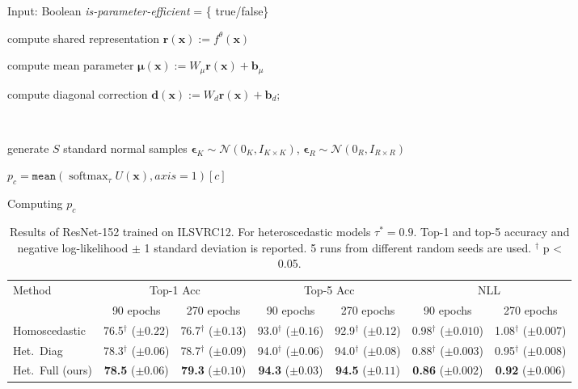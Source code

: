 \documentclass[final]{cvpr}
\DeclareMathOperator*{\softmax}{softmax}
\begin{document}
\begin{algorithm}[t]
\SetAlgoLined
Input: Boolean \textit{is-parameter-efficient} = \{ true/false\}\;

 compute shared representation $\mathbf{r}(\mathbf{x}) := f^{\theta}(\mathbf{x})$\;
 
 compute mean parameter $\boldsymbol{\mu}(\mathbf{x}) := W_\mu \mathbf{r}(\mathbf{x}) + \mathbf{b}_\mu$\;
 
 compute diagonal correction $\mathbf{d}(\mathbf{x}) := W_d \mathbf{r}(\mathbf{x}) + \mathbf{b}_d$;
 
 \
 
 generate $S$ standard normal samples $\boldsymbol{\epsilon}_K \sim \mathcal{N}(0_K, I_{K\times K})$, $\boldsymbol{\epsilon}_R \sim \mathcal{N}(0_R, I_{R\times R})$\;

  
  $p_c =\texttt{mean}(\softmax_{\tau} U(\mathbf{x}), axis=1)[c]$
 \caption{Computing $p_c$}
 \label{algo:compute_pc}
\end{algorithm}

\begin{table*}[tbh]
\centering
\begin{tabular}{lcccccc}
\toprule
Method & \multicolumn{2}{c}{Top-1 Acc} & \multicolumn{2}{c}{Top-5 Acc} & \multicolumn{2}{c}{NLL} \\
& 90 epochs & 270 epochs & 90 epochs & 270 epochs & 90 epochs & 270 epochs \\
\midrule
Homoscedastic & 76.5$^\dagger$ ($\pm 0.22$) & 76.7$^\dagger$ ($\pm 0.13$) & 93.0$^\dagger$ ($\pm 0.16$) & 92.9$^\dagger$ ($\pm 0.12$) & 0.98$^\dagger$ ($\pm 0.010$) & 1.08$^\dagger$ ($\pm 0.007$) \\
Het.\ Diag~\cite{collier2020analysis} & 78.3$^\dagger$ ($\pm 0.06$) & 78.7$^\dagger$   ($\pm 0.09$) & 94.0$^\dagger$ ($\pm 0.06$) & 94.0$^\dagger$ ($\pm 0.08$) & 0.88$^\dagger$ ($\pm 0.003$) & 0.95$^\dagger$ ($\pm 0.008$)\\ 
Het.\ Full (ours) & \textbf{78.5} ($\pm 0.06$) & \textbf{79.3}  ($\pm 0.10$) & \textbf{94.3} ($\pm 0.03$) & \textbf{94.5} ($\pm 0.11$) & \textbf{0.86} ($\pm 0.002$) & \textbf{0.92} ($\pm 0.006$)\\ 
\bottomrule
\end{tabular}
\caption{Results of ResNet-152 trained on ILSVRC12. For heteroscedastic models $\tau^\ast = 0.9$. Top-1 and top-5 accuracy and negative log-likelihood $\pm$ 1 standard deviation is reported. 5 runs from different random seeds are used. $^\dagger$ p < 0.05.} 
\label{table:het_vs_hom_imagenet}
\end{table*}
\end{document}
